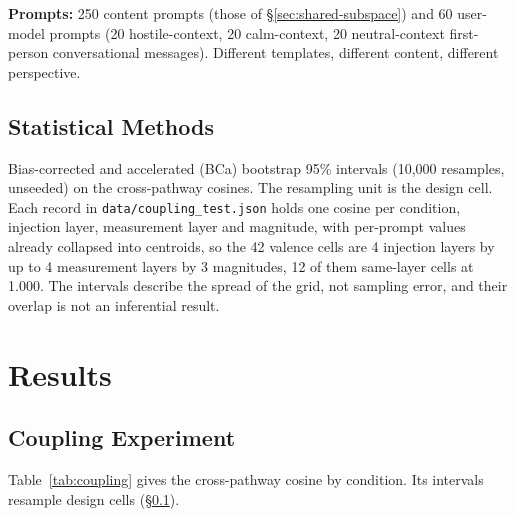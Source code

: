 \documentclass[11pt,a4paper]{article}
\begin{document}
\textbf{Prompts:} 250 content prompts (those of \S\ref{sec:shared-subspace}) and 60 user-model prompts (20 hostile-context, 20 calm-context, 20 neutral-context first-person conversational messages). Different templates, different content, different perspective.

\subsection{Statistical Methods}
\label{sec:stats}

Bias-corrected and accelerated (BCa) bootstrap 95\% intervals (10,000 resamples, unseeded) on the cross-pathway cosines. The resampling unit is the design cell. Each record in \texttt{data/\allowbreak coupling\_test.json} holds one cosine per condition, injection layer, measurement layer and magnitude, with per-prompt values already collapsed into centroids, so the 42 valence cells are 4 injection layers by up to 4 measurement layers by 3 magnitudes, 12 of them same-layer cells at 1.000. The intervals describe the spread of the grid, not sampling error, and their overlap is not an inferential result.

\section{Results}
\label{sec:results}

\subsection{Coupling Experiment}
\label{sec:results-coupling}

Table~\ref{tab:coupling} gives the cross-pathway cosine by condition. Its intervals resample design cells (\S\ref{sec:stats}).
\end{document}
